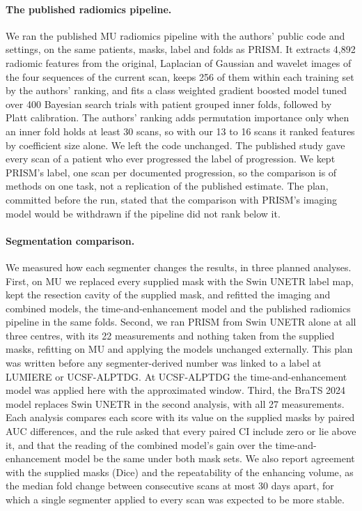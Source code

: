 \paragraph*{The published radiomics pipeline.} We ran the published MU radiomics pipeline \citep{christodoulou2026}
with the authors' public code and settings, on the same patients, masks, label and folds as PRISM. It extracts 4,892
radiomic features from the original, Laplacian of Gaussian and wavelet images of the four sequences of the current
scan, keeps 256 of them within each training set by the authors' ranking, and fits a class weighted gradient boosted
model tuned over 400 Bayesian search trials with patient grouped inner folds, followed by Platt calibration. The
authors' ranking adds permutation importance only when an inner fold holds at least 30 scans, so with our 13 to 16
scans it ranked features by coefficient size alone. We left the code unchanged. The published study gave every scan
of a patient who ever progressed the label of progression. We kept PRISM's label, one scan per documented
progression, so the comparison is of methods on one task, not a replication of the published estimate. The plan,
committed before the run, stated that the comparison with PRISM's imaging model would be withdrawn if the pipeline
did not rank below it.

\paragraph*{Segmentation comparison.} We measured how each segmenter changes the results, in three planned analyses.
First, on MU we replaced every supplied mask with the Swin UNETR label map, kept the resection cavity of the supplied
mask, and refitted the imaging and combined models, the time-and-enhancement model and the published radiomics
pipeline in the same folds. Second, we ran PRISM from Swin UNETR alone at all three centres, with its 22 measurements
and nothing taken from the supplied masks, refitting on MU and applying the models unchanged externally. This plan was
written before any segmenter-derived number was linked to a label at LUMIERE or UCSF-ALPTDG. At UCSF-ALPTDG the
time-and-enhancement model was applied here with the approximated window. Third, the BraTS 2024 model replaces Swin
UNETR in the second analysis, with all 27 measurements. Each analysis compares each score with its value on the
supplied masks by paired AUC differences, and the rule asked that every paired CI include zero or lie above it, and
that the reading of the combined model's gain over the time-and-enhancement model be the same under both mask sets.
We also report agreement with the supplied masks (Dice) and the repeatability of the enhancing volume, as the median
fold change between consecutive scans at most 30 days apart, for which a single segmenter applied to every scan was
expected to be more stable.

